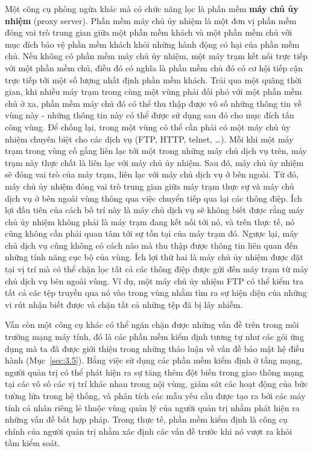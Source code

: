 Một công cụ phòng ngừa khác mà có chức năng lọc là phần mềm \textbf{máy chủ ủy nhiệm}
(proxy server). Phần mềm máy chủ ủy nhiệm là một đơn vị phần mềm đóng vai trò trung gian
giữa một phần mềm khách và một phần mềm chủ với mục đích bảo vệ phần mềm khách khỏi những
hành động có hại của phần mềm chủ. Nếu không có phần mềm máy chủ ủy nhiệm, một máy trạm
kết nối trực tiếp với một phần mềm chủ, điều đó có nghĩa là phần mềm chủ đó có  cơ hội tiếp cận trực tiếp tới
 một số lượng nhất định phần mềm khách. Trải qua một quãng thời gian, khi nhiều
máy trạm trong cùng một vùng phải đối phó với một phần mềm chủ ở xa, phần mềm máy chủ đó
có thể thu thập được vô số những thông tin về vùng này - những thông tin này có thể được
sử dụng sau đó cho mục đích tấn công vùng. Để chống lại, trong một vùng có thể cần phải có
một máy chủ ủy nhiệm chuyên biệt cho các dịch vụ (FTP, HTTP, telnet, …). Mỗi khi một máy
trạm trong vùng cố gắng liên lạc tới một trong những máy chủ dịch vụ trên, máy trạm này
thực chất là liên lạc với máy chủ ủy nhiệm. Sau đó, máy chủ ủy nhiệm sẽ đóng vai trò của
máy trạm, liên lạc với máy chủ dịch vụ ở bên ngoài. Từ đó, máy chủ ủy nhiệm đóng vai trò
trung gian giữa máy trạm thực sự và máy chủ dịch vụ ở bên ngoài vùng thông qua việc chuyển
tiếp qua lại các thông điệp. Ích lợi đầu tiên của cách bố trí này là máy chủ dịch vụ sẽ
không biết được rằng máy chủ ủy nhiệm không phải là máy trạm đang kết nối tới nó, và trên
thực tế, nó cũng không cần phải quan tâm tới sự tồn tại của máy trạm đó. Ngược lại, máy
chủ dịch vụ cũng không có cách nào mà thu thập được thông tin liên quan đến những tính
năng cục bộ của vùng. Ích lợi thứ hai là máy chủ ủy nhiệm được đặt tại vị trí mà có thể
chặn lọc tất cả các thông điệp được gửi đến máy trạm từ máy chủ dịch vụ bên ngoài vùng. Ví
dụ, một máy chủ ủy nhiệm FTP có thể kiểm tra tất cả các tệp truyền qua nó vào trong vùng
nhằm tìm ra sự hiện diện của những vi rút nhận biết được và chặn tất cả những tệp đã bị
lây nhiễm.

Vẫn còn một công cụ khác có thể ngăn chặn được những vấn đề trên trong môi trường mạng máy
tính, đó là các phần mềm kiểm định tương tự như các gói ứng dụng mà ta đã được giới thiệu
trong những thảo luận về vấn đề bảo mật hệ điều hành (Mục~\ref{sec:3.5}). Bằng việc sử
dụng các phần mềm kiểm định ở tầng mạng, người quản trị có thể phát hiện ra sự tăng thêm
đột biến trong giao thông mạng tại các vô số các vị trí khác nhau trong nội vùng, giám sát
các hoạt động của bức tường lửa trong hệ thống, và phân tích các mẫu yêu cầu được tạo ra
bởi các máy tính cá nhân riêng lẻ thuộc vùng quản lý của người quản trị nhằm phát hiện ra
những vấn đề bất hợp pháp. Trong thực tế, phần mềm kiểm định là công cụ chính của người
quản trị nhằm xác định các vấn đề trước khi nó vượt ra khỏi tầm kiểm soát.


